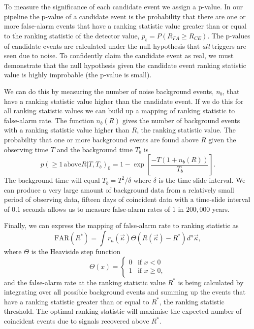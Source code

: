 To measure the significance of each candidate event we assign a p-value. In our pipeline the p-value of a candidate event is the probability that there are one or more false-alarm events that have a ranking statistic value greater than or equal to the ranking statistic of the detector value, $p_{b} = P(R_{FA} \ge R_{CE})$. The p-values of candidate events are calculated under the null hypothesis that \textit{all} triggers are seen due to noise. To confidently claim the candidate event as real, we must demonstrate that the null hypothesis given the candidate event ranking statistic value is highly improbable (the p-value is small).

We can do this by measuring the number of noise background events, $n_{b}$, that have a ranking statistic value higher than the candidate event. If we do this for all ranking statistic values we can build up a mapping of ranking statistic to false-alarm rate. The function $n_{b}(R)$ gives the number of background events with a ranking statistic value higher than $R$, the ranking statistic value. The probability that one or more background events are found above $R$ given the observing time $T$ and the background time $T_{b}$ is~\cite{PyCBC:2016}
%
\begin{equation}
    p(\ge 1 \, \text{above} R|T, T_{b})_{0} = 1 - \exp \left[\frac{-T(1 + n_{b}(R))}{T_{b}}\right].
\end{equation}
%
The background time will equal $T_{b} = T^{2}/\delta$ where $\delta$ is the time-slide interval. We can produce a very large amount of background data from a relatively small period of observing data, fifteen days of coincident data with a time-slide interval of $0.1$ seconds allows us to measure false-alarm rates of $1$ in $200,000$ years.

Finally, we can express the mapping of false-alarm rate to ranking statistic as
%
\begin{equation}
    \text{FAR}(R^{*}) = \int r_{n}(\vec{\kappa}) \Theta(R(\vec{\kappa}) - R^{*}) d^{n}\vec{\kappa},
    \label{2:eq:far_mapping}
\end{equation}
%
where $\Theta$ is the Heaviside step function
%
\begin{equation}
    \Theta(x) =
    \begin{cases} 
        0 & \text{if } x < 0 \\
        1 & \text{if } x \geq 0,
    \end{cases}
\end{equation}
%
and the false-alarm rate at the ranking statistic value $R^{*}$ is being calculated by integrating over all possible background events and summing up the events that have a ranking statistic greater than or equal to $R^{*}$, the ranking statistic threshold. The optimal ranking statistic will maximise the expected number of coincident events due to signals recovered above $R^{*}$.

